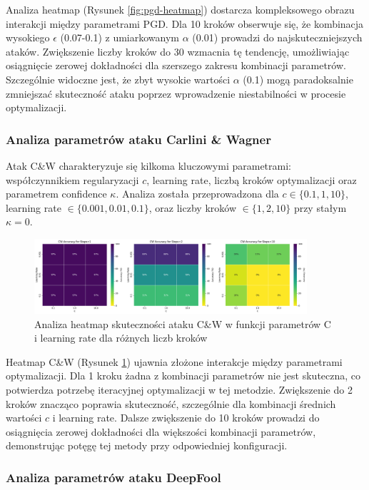 \documentclass[12pt]{article}
\begin{document}
Analiza heatmap (Rysunek \ref{fig:pgd-heatmap}) dostarcza kompleksowego obrazu interakcji między parametrami PGD. Dla 10 kroków obserwuje się, że kombinacja wysokiego $\epsilon$ (0.07-0.1) z umiarkowanym $\alpha$ (0.01) prowadzi do najskuteczniejszych ataków. Zwiększenie liczby kroków do 30 wzmacnia tę tendencję, umożliwiając osiągnięcie zerowej dokładności dla szerszego zakresu kombinacji parametrów. Szczególnie widoczne jest, że zbyt wysokie wartości $\alpha$ (0.1) mogą paradoksalnie zmniejszać skuteczność ataku poprzez wprowadzenie niestabilności w procesie optymalizacji.

\subsubsection{Analiza parametrów ataku Carlini \& Wagner}

Atak C\&W charakteryzuje się kilkoma kluczowymi parametrami: współczynnikiem regularyzacji $c$, learning rate, liczbą kroków optymalizacji oraz parametrem confidence $\kappa$. Analiza została przeprowadzona dla $c \in \{0.1, 1, 10\}$, learning rate $\in \{0.001, 0.01, 0.1\}$, oraz liczby kroków $\in \{1, 2, 10\}$ przy stałym $\kappa = 0$.

\begin{figure}[H]
    \centering
    \includegraphics[width=0.9\textwidth]{cw_heatmap.png}
    \caption{Analiza heatmap skuteczności ataku C\&W w funkcji parametrów C i learning rate dla różnych liczb kroków}
    \label{fig:cw-heatmap}
\end{figure}

Heatmap C\&W (Rysunek \ref{fig:cw-heatmap}) ujawnia złożone interakcje między parametrami optymalizacji. Dla 1 kroku żadna z kombinacji parametrów nie jest skuteczna, co potwierdza potrzebę iteracyjnej optymalizacji w tej metodzie. Zwiększenie do 2 kroków znacząco poprawia skuteczność, szczególnie dla kombinacji średnich wartości $c$ i learning rate. Dalsze zwiększenie do 10 kroków prowadzi do osiągnięcia zerowej dokładności dla większości kombinacji parametrów, demonstrując potęgę tej metody przy odpowiedniej konfiguracji.

\subsubsection{Analiza parametrów ataku DeepFool}
\end{document}
